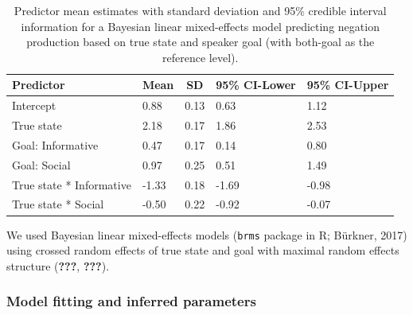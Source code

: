 \documentclass[floatsintext,man]{apa6}
\theoremstyle{definition}
\theoremstyle{definition}
\theoremstyle{definition}
\theoremstyle{remark}
\begin{document}
\begin{table}[tbp]
\begin{center}
\begin{threeparttable}
\caption{\label{tab:brmTab}Predictor mean estimates with standard deviation and 95\% credible interval information for a Bayesian linear mixed-effects model predicting negation production based on true state and speaker goal (with both-goal as the reference level).}
\begin{tabular}{lllll}
\toprule
Predictor & \multicolumn{1}{c}{Mean} & \multicolumn{1}{c}{SD} & \multicolumn{1}{c}{95\% CI-Lower} & \multicolumn{1}{c}{95\% CI-Upper}\\
\midrule
Intercept & 0.88 & 0.13 & 0.63 & 1.12\\
True state & 2.18 & 0.17 & 1.86 & 2.53\\
Goal: Informative & 0.47 & 0.17 & 0.14 & 0.80\\
Goal: Social & 0.97 & 0.25 & 0.51 & 1.49\\
True state * Informative & -1.33 & 0.18 & -1.69 & -0.98\\
True state * Social & -0.50 & 0.22 & -0.92 & -0.07\\
\bottomrule
\end{tabular}
\end{threeparttable}
\end{center}
\end{table}

We used Bayesian linear mixed-effects models (\texttt{brms} package in
R; Bürkner, 2017) using crossed random effects of true state and goal
with maximal random effects structure ({\textbf{???}}, {\textbf{???}}).

\subsubsection{Model fitting and inferred
parameters}\label{model-fitting-and-inferred-parameters}
\end{document}
